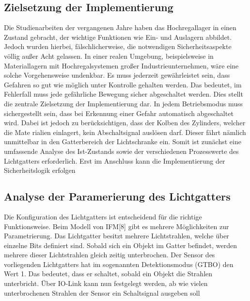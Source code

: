 \subsection{Zielsetzung der Implementierung}
Die Studienarbeiten der vergangenen Jahre haben das Hochregallager in einen Zustand
gebracht, der wichtige Funktionen wie Ein- und Auslagern abbildet.
Jedoch wurden hierbei, fälschlicherweise, die notwendigen Sicherheitsaspekte völlig
außer Acht gelassen.
In einer realen Umgebung, beispielsweise in Materiallagern mit Hochregalsystemen
großer Industrieunternehmen, wäre eine solche Vorgehensweise undenkbar.
Es muss jederzeit gewährleistet sein, dass Gefahren so gut wie möglich unter Kontrolle
gehalten werden. Das bedeutet, im Fehlerfall muss jede gefährliche Bewegung sicher
abgeschaltet werden.
Dies stellt die zentrale Zielsetzung der Implementierung dar. In jedem Betriebsmodus
muss sichergestellt sein, dass bei Erkennung einer Gefahr automatisch abgeschaltet
wird.
Dabei ist jedoch zu berücksichtigen, dass der Kolben des Zylinders, welcher die Mate
rialien einlagert, kein Abschaltsignal auslösen darf. Dieser fährt nämlich unmittelbar in
den Gatterbereich der Lichtschranke ein.
Somit ist zunächst eine umfassende Analyse des Ist-Zustands sowie der verschiedenen
Prozesswerte des Lichtgatters erforderlich.
Erst im Anschluss kann die Implementierung der Sicherheitslogik erfolgen

\subsection{Analyse der Paramerierung des Lichtgatters}
Die Konfiguration des Lichtgatters ist entscheidend für die richtige Funktionsweise. Beim
Modell von IFM[8] gibt es mehrere Möglichkeiten zur Parametrierung.
Das Lichtgatter besitzt mehrere Lichtstrahlen, welche über einzelne Bits definiert sind.
Sobald sich ein Objekt im Gatter befindet, werden mehrere dieser Lichtstrahlen gleich
zeitig unterbrochen.
Der Sensor des vorliegenden Lichtgatters hat im sogenannten Detektionsmodus
(GTBO) den Wert 1. Das bedeutet, dass er schaltet, sobald ein Objekt die Strahlen
unterbricht.
Über IO-Link kann nun festgelegt werden, ab wie vielen unterbrochenen Strahlen der
Sensor ein Schaltsignal ausgeben soll

